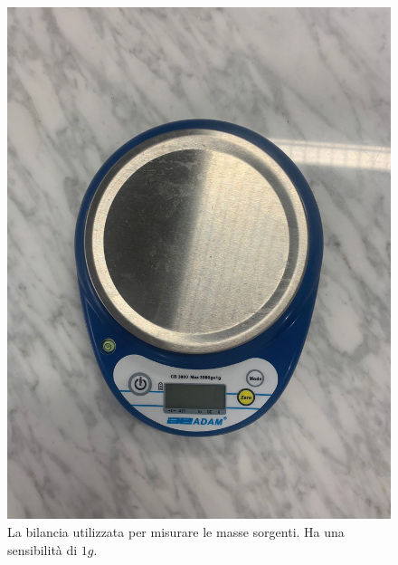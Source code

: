 \documentclass{article}
\begin{document}
\begin{figure}[ht!]
    \centering
    \begin{minipage}[t]{0.3\linewidth}
        \includegraphics[width=\linewidth]{images/bilancia.jpeg}
        \caption{La bilancia utilizzata per misurare le masse sorgenti. Ha una sensibilità di $1g$.}
        \label{fig:bilancia}
    \end{minipage}\hfill
    \begin{minipage}[t]{0.3\linewidth}

\end{minipage}
\end{figure}
\end{document}
